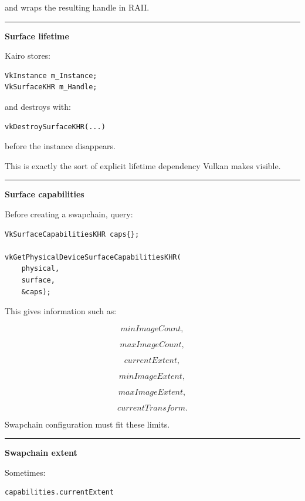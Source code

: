 and wraps the resulting handle in RAII.

\begin{center}\rule{0.5\linewidth}{0.5pt}\end{center}

\textbf{Surface lifetime}

Kairo stores:

\begin{verbatim}
VkInstance m_Instance;
VkSurfaceKHR m_Handle;
\end{verbatim}

and destroys with:

\begin{verbatim}
vkDestroySurfaceKHR(...)
\end{verbatim}

before the instance disappears.

This is exactly the sort of explicit lifetime dependency Vulkan makes visible.

\begin{center}\rule{0.5\linewidth}{0.5pt}\end{center}

\textbf{Surface capabilities}

Before creating a swapchain, query:

\begin{verbatim}
VkSurfaceCapabilitiesKHR caps{};

vkGetPhysicalDeviceSurfaceCapabilitiesKHR(
    physical,
    surface,
    &caps);
\end{verbatim}

This gives information such as:

\[
minImageCount,
\]

\[
maxImageCount,
\]

\[
currentExtent,
\]

\[
minImageExtent,
\]

\[
maxImageExtent,
\]

\[
currentTransform.
\]

Swapchain configuration must fit these limits.

\begin{center}\rule{0.5\linewidth}{0.5pt}\end{center}

\textbf{Swapchain extent}

Sometimes:

\begin{verbatim}
capabilities.currentExtent
\end{verbatim}

